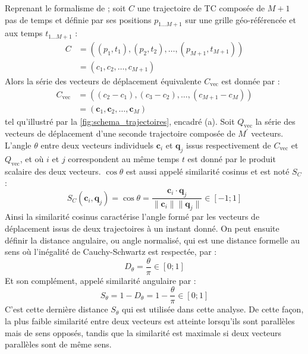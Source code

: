 \documentclass[../main.tex]{subfiles}
\begin{document}
Reprenant le formalisme de \textcite{nakamura_shapebased_2013} ; soit $C$ une trajectoire de TC composée de $M+1$ pas de temps et définie par ses positions
$p_{1...M+1}$ sur une grille géo-référencée et aux temps $t_{1...M+1}$ :
%
\begin{align*}
    C &= ((p_1, t_1), (p_2, t_2), \ldots, (p_{M+1}, t_{M+1}))\\
      &= (c_1, c_2, \ldots, c_{M+1})
\end{align*}
%
Alors la série des vecteurs de déplacement équivalente $C_{\text{vec}}$ est donnée par :
\begin{align*}
    C_{\text{vec}} &= ((c_2 - c_1), (c_3 - c_2), \ldots, (c_{M+1} - c_M))\\
            &= (\mathbf{c}_1, \mathbf{c}_2, \ldots, \mathbf{c}_M)
\end{align*}
%
tel qu'illustré par la \cref{fig:schema_trajectoires}, encadré (a). Soit $Q_{\text{vec}}$ la série des vecteurs de déplacement d'une seconde trajectoire composée de
$M^\prime$ vecteurs. L'angle $\theta$ entre deux vecteurs individuels $\mathbf{c}_i$ et $\mathbf{q}_j$ issus respectivement de $C_{\text{vec}}$ et
$Q_{\text{vec}}$, et où $i$ et $j$ correspondent au même temps $t$ est donné par le produit scalaire des deux vecteurs. $\cos \theta$ est aussi appelé
similarité cosinus et est noté $S_C$ :
%
\begin{equation*}
    S_C(\mathbf{c}_i, \mathbf{q}_j) = \cos \theta = \frac{\mathbf{c}_i \cdot \mathbf{q}_j}{\lVert \mathbf{c}_i \rVert \lVert \mathbf{q}_j \rVert} \in [-1; 1] 
\end{equation*}
%
Ainsi la similarité cosinus caractérise l'angle formé par les vecteurs de déplacement issus de deux trajectoires à un instant donné. On peut ensuite définir la
distance angulaire, ou angle normalisé, qui est une distance formelle au sens où l'inégalité de Cauchy-Schwartz est respectée, par :
%
\begin{equation*}
    D_\theta = \frac{\theta}{\pi} \in [0; 1]
\end{equation*}
%
Et son complément, appelé similarité angulaire par :
%
\begin{equation*}
    S_\theta = 1 - D_\theta = 1 - \frac{\theta}{\pi} \in [0; 1]
\end{equation*}
%
C'est cette dernière distance $S_\theta$ qui est utilisée dans cette analyse. De cette façon, la plus faible similarité entre deux vecteurs est atteinte
lorsqu'ils sont parallèles mais de sens opposés, tandis que la similarité est maximale si deux vecteurs parallèles sont de même sens.
\end{document}
